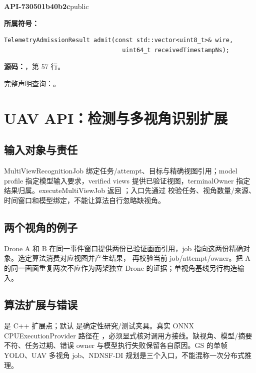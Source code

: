 \textbf{API-730501b40b2c}\quad public\par
\textbf{所属符号：}\par
\begin{Verbatim}[fontsize=\footnotesize,breaklines,breakanywhere]
TelemetryAdmissionResult admit(const std::vector<uint8_t>& wire,
                                 uint64_t receivedTimestampNs);
\end{Verbatim}
\textbf{源码：}，第 57 行。\par

完整声明查询：。

\section{UAV API：检测与多视角识别扩展}

\subsection{输入对象与责任}
MultiViewRecognitionJob 绑定任务/attempt、目标与精确视图引用；model profile 指定模型输入要求，verified views 提供已验证视图，terminalOwner 指定结果归属。executeMultiViewJob 返回 ；入口先通过  校验任务、视角数量/来源、时间窗口和模型绑定，不能让算法自行忽略缺视角。

\subsection{两个视角的例子}
Drone A 和 B 在同一事件窗口提供两份已验证画面引用，job 指向这两份精确对象。选定算法消费对应视图并产生结果， 再校验当前 job/attempt/owner。把 A 的同一画面重复两次不应作为两架独立 Drone 的证据；单视角基线另行构造输入。

\subsection{算法扩展与错误}
 是 C++ 扩展点；默认  是确定性研究/测试夹具。真实 ONNX CPUExecutionProvider 路径在 ，必须显式核对调用方接线。缺视角、模型/摘要不符、任务过期、错误 owner 与模型执行失败保留各自原因。GS 的单帧 YOLO、UAV 多视角 job、NDNSF-DI 规划是三个入口，不能混称一次分布式推理。


